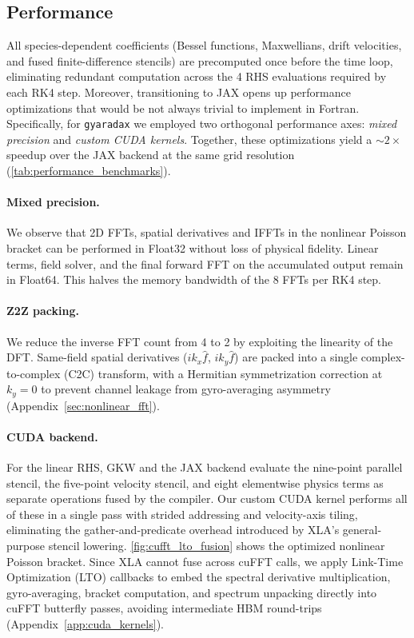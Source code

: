 \documentclass{article}
\theoremstyle{plain}
\theoremstyle{definition}
\theoremstyle{remark}
\begin{document}
\subsection{Performance}
All species-dependent coefficients (Bessel functions, Maxwellians, drift velocities, and fused finite-difference stencils) are precomputed once before the time loop, eliminating redundant computation across the 4 RHS evaluations required by each RK4 step.
%
Moreover, transitioning to JAX opens up performance optimizations that would be not always trivial to implement in Fortran.
%
Specifically, for \texttt{gyaradax} we employed two orthogonal performance axes: \emph{mixed precision} and \emph{custom CUDA kernels}.
Together, these optimizations yield a ${\sim}2{\times}$ speedup over the JAX backend at the same grid resolution (\cref{tab:performance_benchmarks}).


%
\paragraph{Mixed precision.}
We observe that 2D FFTs, spatial derivatives and IFFTs in the nonlinear Poisson bracket can be performed in Float32 without loss of physical fidelity. Linear terms, field solver, and the final forward FFT on the accumulated output remain in Float64. This halves the memory bandwidth of the 8 FFTs per RK4 step.

\paragraph{Z2Z packing.}
We reduce the inverse FFT count from 4 to 2 by exploiting the linearity of the DFT. Same-field spatial derivatives ($ik_x \hat{f}$, $ik_y \hat{f}$) are packed into a single complex-to-complex (C2C) transform, with a Hermitian symmetrization correction at $k_y{=}0$ to prevent channel leakage from gyro-averaging asymmetry (Appendix~\ref{sec:nonlinear_fft}).

\paragraph{CUDA backend.}
For the linear RHS, GKW and the JAX backend evaluate the nine-point parallel stencil, the five-point velocity stencil, and eight elementwise physics terms as separate operations fused by the compiler. Our custom CUDA kernel performs all of these in a single pass with strided addressing and velocity-axis tiling, eliminating the gather-and-predicate overhead introduced by XLA's general-purpose stencil lowering.
%
\cref{fig:cufft_lto_fusion} shows the optimized nonlinear Poisson bracket. Since XLA cannot fuse across cuFFT calls, we apply Link-Time Optimization (LTO) callbacks to embed the spectral derivative multiplication, gyro-averaging, bracket computation, and spectrum unpacking directly into cuFFT butterfly passes, avoiding intermediate HBM round-trips (Appendix~\ref{app:cuda_kernels}).
%
\end{document}
